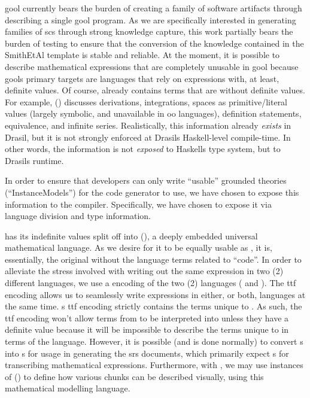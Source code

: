 \acs{gool} currently bears the burden of creating a family of software artifacts
through describing a single \acs{gool} program. As we are specifically
interested in generating families of \acs{scs} through strong knowledge capture,
this work partially bears the burden of testing to ensure that the conversion of
the knowledge contained in the SmithEtAl template \cite{SmithAndLai2005} is
stable and reliable. At the moment, it is possible to describe mathematical
expressions that are completely unusable in \acs{gool} because \acsp{gool}
primary targets are languages that rely on expressions with, at least, definite
values. Of course, \Expr{} already contains terms that are without definite
values. For example, \Expr{} () discusses derivations,
integrations, spaces as primitive/literal values (largely symbolic, and
unavailable in \acs{oo} languages), definition statements, equivalence, and infinite series. Realistically, this information
already \textit{exists} in Drasil, but it is not strongly enforced at Drasils
Haskell-level compile-time. In other words, the information is not
\textit{exposed} to Haskells type system, but to Drasils runtime.

In order to ensure that developers can only write ``usable'' grounded theories
(``InstanceModels'') for the code generator to use, we have chosen to expose
this information to the compiler. Specifically, we have chosen to expose it via
language division and type information.

\languageDivision{}


\Expr{} has its indefinite values split off into \ModelExpr{}
(), a deeply embedded universal mathematical
language. As we desire for it to be equally usable as \Expr{}, it is,
essentially, the original \Expr{} without the language terms related to
``code''. In order to alleviate the stress involved with
writing out the same expression in two (2) different languages, we use a
 encoding of the two (2) languages ( and
). The \acs{ttf} encoding allows us to
seamlessly write expressions in either, or both, languages at the same time.
\ModelExpr{}s \acs{ttf} encoding strictly contains the terms unique to
\ModelExpr{}. As such, the \acs{ttf} encoding won't allow terms from
\ModelExpr{} to be interpreted into \Expr{} unless they have a definite value
because it will be impossible to describe the terms unique to \ModelExpr{} in
terms of the \Expr{} language. However, it is possible (and is done normally) to
convert \Expr{}s into \ModelExpr{}s for usage in generating the \acs{srs}
documents, which primarily expect \ModelExpr{}s for transcribing mathematical
expressions. Furthermore, with \ModelExpr{}, we may use instances of \Express{}
() to define how various chunks can be described
visually, using this mathematical modelling language.

